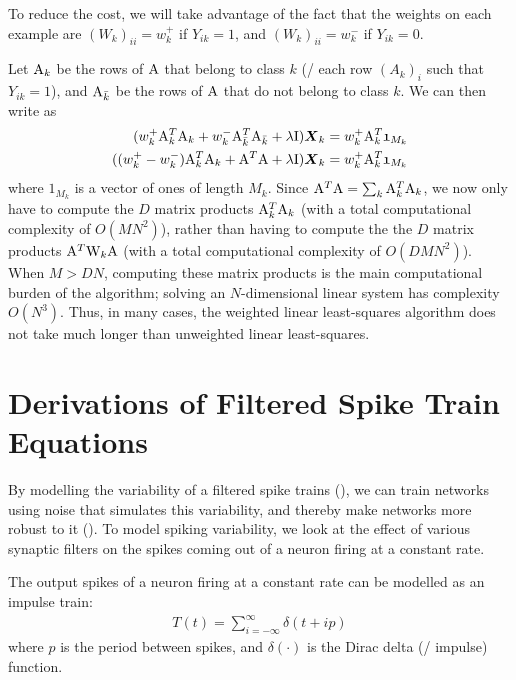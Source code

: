 \begin{appendices}
To reduce the cost, we will take advantage of the fact that the weights
on each example are $(W_k)_{ii} = w_k^+$ if $Y_{ik} = 1$,
and $(W_k)_{ii} = w_k^-$ if $Y_{ik} = 0$.

Let $\mathrm{A}_k$ be the rows of $\mathrm{A}$ that belong to class $k$
(\ie/ each row $(A_k)_i$ such that $Y_{ik} = 1$),
and $\mathrm{A}_{\bar k}$ be the rows of $\mathrm{A}$ that do not belong to class $k$.
We can then write  as
\begin{align}
  (w_k^+ \mathrm{A}_k^T \mathrm{A}_k + w_k^- \mathrm{A}_{\bar k}^T \mathrm{A}_{\bar k} + \lambda\mathrm{I}) \boldsymbol{X}_k
    &= w_k^+ \mathrm{A}_k^T \mathfrak{1}_{M_k} \\
  ((w_k^+ - w_k^-) \mathrm{A}_k^T \mathrm{A}_k + \mathrm{A}^T \mathrm{A} + \lambda\mathrm{I}) \boldsymbol{X}_k
    &= w_k^+ \mathrm{A}_k^T \mathfrak{1}_{M_k}
\end{align}
where $\mathfrak{1}_{M_k}$ is a vector of ones of length $M_k$.
Since $\mathrm{A}^T \mathrm{A} = \sum_k \mathrm{A}_k^T \mathrm{A}_k$,
we now only have to compute the $D$ matrix products $\mathrm{A}_k^T \mathrm{A}_k$
(with a total computational complexity of $O(MN^2)$),
rather than having to compute the the $D$ matrix products $\mathrm{A}^T \mathrm{W}_k \mathrm{A}$
(with a total computational complexity of $O(DMN^2)$).
When $M > DN$, computing these matrix products is the main computational burden
of the algorithm;
solving an $N$-dimensional linear system has complexity $O(N^3)$.
Thus, in many cases, the weighted linear least-squares algorithm
does not take much longer than unweighted linear least-squares.


\chapter{Derivations of Filtered Spike Train Equations}

By modelling the variability of a filtered spike trains (),
we can train networks using noise that simulates this variability,
and thereby make networks more robust to it ().
To model spiking variability,
we look at the effect of various synaptic filters
on the spikes coming out of a neuron firing at a constant rate.

The output spikes of a neuron firing at a constant rate
can be modelled as an impulse train:
\begin{align}
  T(t) = \sum\limits_{i=-\infty}^{\infty} \delta(t + ip)
\end{align}
where $p$ is the period between spikes,
and $\delta(\cdot)$ is the Dirac delta (\aka/ impulse) function.


\end{appendices}
